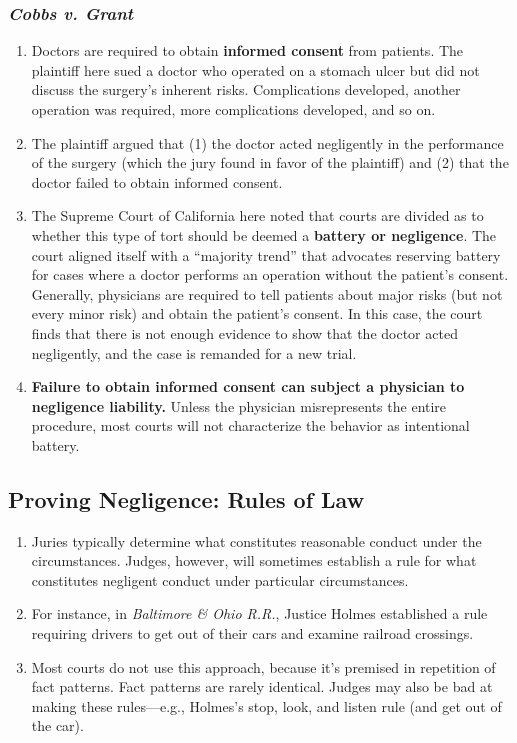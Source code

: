 \subsubsection{\emph{Cobbs v. Grant}}

\begin{enumerate}
    \item Doctors are required to obtain \textbf{informed consent} from patients. The plaintiff here sued a doctor who operated on a stomach ulcer but did not discuss the surgery's inherent risks. Complications developed, another operation was required, more complications developed, and so on.
    \item The plaintiff argued that (1) the doctor acted negligently in the performance of the surgery (which the jury found in favor of the plaintiff) and (2) that the doctor failed to obtain informed consent.
    \item The Supreme Court of California here noted that courts are divided as to whether this type of tort should be deemed a \textbf{battery or negligence}. The court aligned itself with a ``majority trend'' that advocates reserving battery for cases where a doctor performs an operation without the patient's consent. Generally, physicians are required to tell patients about major risks (but not every minor risk) and obtain the patient's consent. In this case, the court finds that there is not enough evidence to show that the doctor acted negligently, and the case is remanded for a new trial.
    \item \textbf{Failure to obtain informed consent can subject a physician to negligence liability.} Unless the physician misrepresents the entire procedure, most courts will not characterize the behavior as intentional battery.
\end{enumerate}

\subsection{Proving Negligence: Rules of Law}

\begin{enumerate}
    \item Juries typically determine what constitutes reasonable conduct under the circumstances. Judges, however, will sometimes establish a rule for what constitutes negligent conduct under particular circumstances.
    \item For instance, in \emph{Baltimore \& Ohio R.R.}, Justice Holmes established a rule requiring drivers to get out of their cars and examine railroad crossings.
    \item Most courts do not use this approach, because it's premised in repetition of fact patterns. Fact patterns are rarely identical. Judges may also be bad at making these rules---e.g., Holmes's stop, look, and listen rule (and get out of the car).
\end{enumerate}

